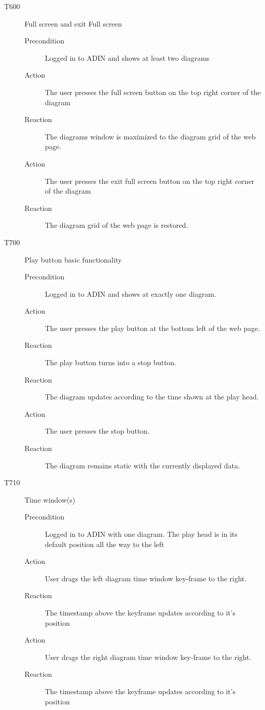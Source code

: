 \documentclass[twoside, english, draft]{Pflichtenheft}
\begin{document}
\begin{description}
  \item[T600] Full screen and exit Full screen
\begin{description}
    \item[Precondition]
	Logged in to ADIN and shows at least two diagrams
    \item[Action]
    The user presses the full screen button on the top right corner of the diagram
    \item[Reaction]
	The diagrams window is maximized to the diagram grid of the web page.
    \item[Action]
    The user presses the exit full screen button on the top right corner of the diagram
    \item[Reaction]
	The diagram grid of the web page is restored.
\end{description}

  \item[T700] Play button basic functionality
\begin{description}
    \item[Precondition]
	Logged in to ADIN and shows at exactly one diagram.
    \item[Action]
    The user presses the play button at the bottom left of the web page.
    \item[Reaction]
	The play button turns into a stop button.
    \item[Reaction]
	The diagram updates according to the time shown at the play head.
    \item[Action]
	The user presses the stop button.
    \item[Reaction]
	The diagram remains static with the currently displayed data.
\end{description}

  \item[T710] Time window(s)
\begin{description}
    \item[Precondition]
	Logged in to ADIN with one diagram. The play head is in its default position all the way to the left
    \item[Action]
	User drags the left diagram time window key-frame to the right.
    \item[Reaction]
	The timestamp above the keyframe updates according to it's position
    \item[Action]
	User drags the right diagram time window key-frame to the right.
    \item[Reaction]
	The timestamp above the keyframe updates according to it's position
\end{description}


\end{description}
\end{document}
